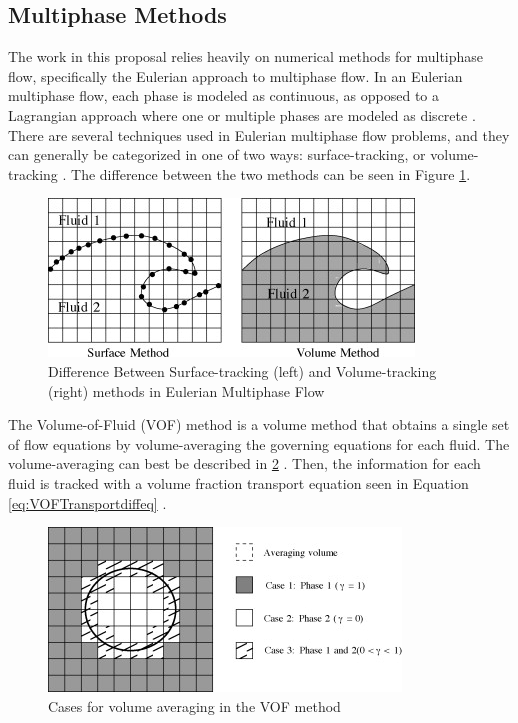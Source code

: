 \documentclass{UCF_ETD}
\begin{document}
\subsection{Multiphase Methods}
\label{sec:multiphase}

The work in this proposal relies heavily on numerical methods for multiphase flow, specifically the Eulerian approach to multiphase flow. In an Eulerian multiphase flow, each phase is modeled as continuous, as opposed to a Lagrangian approach where one or multiple phases are modeled as discrete \cite{GOPALA2008204}. There are several techniques used in Eulerian multiphase flow problems, and they can generally be categorized in one of two ways: surface-tracking, or volume-tracking \cite{GOPALA2008204}. The difference between the two methods can be seen in Figure \ref{fig:SurfaceAndVolumeTracking}.

\begin{figure}
    \centering
    \includegraphics{Figures/surfaceAndVolumeTracking.jpg}
    \caption{Difference Between Surface-tracking (left) and Volume-tracking (right) methods in Eulerian Multiphase Flow \cite{GOPALA2008204}}
    \label{fig:SurfaceAndVolumeTracking}
\end{figure}

The Volume-of-Fluid (VOF) method is a volume method that obtains a single set of flow equations by volume-averaging the governing equations for each fluid. The volume-averaging can best be described in \ref{fig:volumeAveraging} \cite{GOPALA2008204}. Then, the information for each fluid is tracked with a volume fraction transport equation seen in Equation \ref{eq:VOFTransportdiffeq} \cite{HIRT1981201}.

\begin{figure}
    \centering
    \includegraphics{Figures/volumeAveraging.jpg}
    \caption{Cases for volume averaging in the VOF method \cite{GOPALA2008204}}
    \label{fig:volumeAveraging}
\end{figure}
\end{document}
